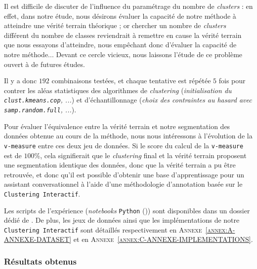 			\begin{leftBarAuthorOpinion}
				Il est difficile de discuter de l'influence du paramétrage du nombre de \textit{clusters} :
				en effet, dans notre étude, nous désirons évaluer la capacité de notre méthode à atteindre une vérité terrain théorique ; or chercher un nombre de \textit{clusters} différent du nombre de classes reviendrait à remettre en cause la vérité terrain que nous essayons d'atteindre, nous empêchant donc d'évaluer la capacité de notre méthode...
				Devant ce cercle vicieux, nous laissons l'étude de ce problème ouvert à de futures études.
			\end{leftBarAuthorOpinion}
			
			Il y a donc $192$ combinaisons testées, et chaque tentative est répétée $5$ fois pour contrer les aléas statistiques des algorithmes de \textit{clustering} (\textit{initialisation du \texttt{clust.kmeans.cop}, ...}) et d'échantillonnage (\textit{choix des contraintes au hasard avec \texttt{samp.random.full}, ...}).
			
			Pour évaluer l'équivalence entre la vérité terrain et notre segmentation des données obtenue au cours de la méthode, nous nous intéressons à l'évolution de la \texttt{v-measure} entre ces deux jeu de données.
			Si le score du calcul de la \texttt{v-measure} est de $100$\%, cela signifierait que le \textit{clustering} final et la vérité terrain proposent une segmentation identique des données, donc que la vérité terrain a pu être retrouvée, et donc qu'il est possible d'obtenir une base d'apprentissage pour un assistant conversationnel à l'aide d'une méthodologie d'annotation basée sur le \texttt{Clustering Interactif}.
			
			\begin{leftBarInformation}
				Les scripts de l'expérience (\textit{notebooks} \texttt{Python} (\cite{van-rossum-drake:2009:python-reference-manual})) sont disponibles dans un dossier dédié de \cite{schild:2021:cognitivefactory-interactiveclusteringcomparativestudy}.
				De plus, les jeux de données ainsi que les implémentations de notre \texttt{Clustering Interactif} sont détaillés respectivement en \textsc{Annexe~\ref{annex:A-ANNEXE-DATASET}} et en \textsc{Annexe~\ref{annex:C-ANNEXE-IMPLEMENTATIONS}}.
			\end{leftBarInformation}

		\subsubsection{Résultats obtenus}
			
